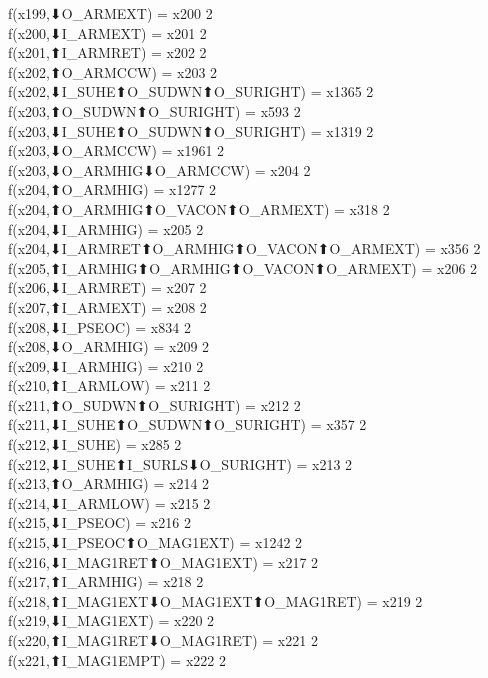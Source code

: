 f(x199,⬇O_ARMEXT) = x200 {2} \\
f(x200,⬇I_ARMEXT) = x201 {2} \\
f(x201,⬆I_ARMRET) = x202 {2} \\
f(x202,⬆O_ARMCCW) = x203 {2} \\
f(x202,⬇I_SUHE⬆O_SUDWN⬆O_SURIGHT) = x1365 {2} \\
f(x203,⬆O_SUDWN⬆O_SURIGHT) = x593 {2} \\
f(x203,⬇I_SUHE⬆O_SUDWN⬆O_SURIGHT) = x1319 {2} \\
f(x203,⬇O_ARMCCW) = x1961 {2} \\
f(x203,⬇O_ARMHIG⬇O_ARMCCW) = x204 {2} \\
f(x204,⬆O_ARMHIG) = x1277 {2} \\
f(x204,⬆O_ARMHIG⬆O_VACON⬆O_ARMEXT) = x318 {2} \\
f(x204,⬇I_ARMHIG) = x205 {2} \\
f(x204,⬇I_ARMRET⬆O_ARMHIG⬆O_VACON⬆O_ARMEXT) = x356 {2} \\
f(x205,⬆I_ARMHIG⬆O_ARMHIG⬆O_VACON⬆O_ARMEXT) = x206 {2} \\
f(x206,⬇I_ARMRET) = x207 {2} \\
f(x207,⬆I_ARMEXT) = x208 {2} \\
f(x208,⬇I_PSEOC) = x834 {2} \\
f(x208,⬇O_ARMHIG) = x209 {2} \\
f(x209,⬇I_ARMHIG) = x210 {2} \\
f(x210,⬆I_ARMLOW) = x211 {2} \\
f(x211,⬆O_SUDWN⬆O_SURIGHT) = x212 {2} \\
f(x211,⬇I_SUHE⬆O_SUDWN⬆O_SURIGHT) = x357 {2} \\
f(x212,⬇I_SUHE) = x285 {2} \\
f(x212,⬇I_SUHE⬆I_SURLS⬇O_SURIGHT) = x213 {2} \\
f(x213,⬆O_ARMHIG) = x214 {2} \\
f(x214,⬇I_ARMLOW) = x215 {2} \\
f(x215,⬇I_PSEOC) = x216 {2} \\
f(x215,⬇I_PSEOC⬆O_MAG1EXT) = x1242 {2} \\
f(x216,⬇I_MAG1RET⬆O_MAG1EXT) = x217 {2} \\
f(x217,⬆I_ARMHIG) = x218 {2} \\
f(x218,⬆I_MAG1EXT⬇O_MAG1EXT⬆O_MAG1RET) = x219 {2} \\
f(x219,⬇I_MAG1EXT) = x220 {2} \\
f(x220,⬆I_MAG1RET⬇O_MAG1RET) = x221 {2} \\
f(x221,⬆I_MAG1EMPT) = x222 {2} \\
